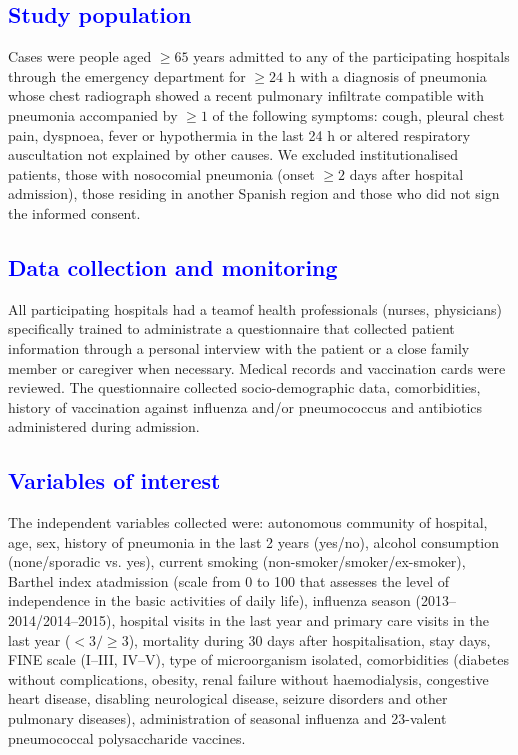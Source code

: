 \documentclass[11pt, a4paper]{article}
\begin{document}
\begin{multicols}{2}
\subsection*{\textcolor{blue}{Study population}}
Cases were people aged $\geq65$ years admitted to any of the participating hospitals through the emergency department for $\geq24$ h with a diagnosis of pneumonia whose chest radiograph showed a recent pulmonary infiltrate compatible with pneumonia accompanied by $\geq1$ of the following symptoms: cough, pleural chest pain, dyspnoea, fever or hypothermia in the last 24 h or altered respiratory auscultation not explained by other causes. We excluded institutionalised patients, those with nosocomial pneumonia (onset $\geq2$ days after hospital admission), those residing in another Spanish region and those who did not sign the informed consent.

\subsection*{\textcolor{blue}{Data collection and monitoring}}
All participating hospitals had a teamof health professionals (nurses, physicians) specifically trained to administrate a questionnaire that collected patient information through a personal interview with the patient or a close family member or caregiver when
necessary. Medical records and vaccination cards were reviewed. The questionnaire collected socio-demographic data, comorbidities, history of vaccination against influenza and/or pneumococcus and antibiotics administered during admission.

\subsection*{\textcolor{blue}{Variables of interest}}
The independent variables collected were: autonomous community of hospital, age, sex, history of pneumonia in the last 2 years (yes/no), alcohol consumption (none/sporadic vs. yes), current smoking (non-smoker/smoker/ex-smoker), Barthel index atadmission (scale from 0 to 100 that assesses the level of independence in the basic activities of daily life), influenza season (2013–2014/2014–2015), hospital visits in the last year and primary
care visits in the last year ($<3/\geq3$), mortality during 30 days after hospitalisation, stay days, FINE scale (I–III, IV–V), type of microorganism isolated, comorbidities (diabetes without complications, obesity, renal failure without haemodialysis, congestive
heart disease, disabling neurological disease, seizure disorders and other pulmonary diseases), administration of seasonal influenza and 23-valent pneumococcal polysaccharide vaccines.


\end{multicols}
\end{document}
